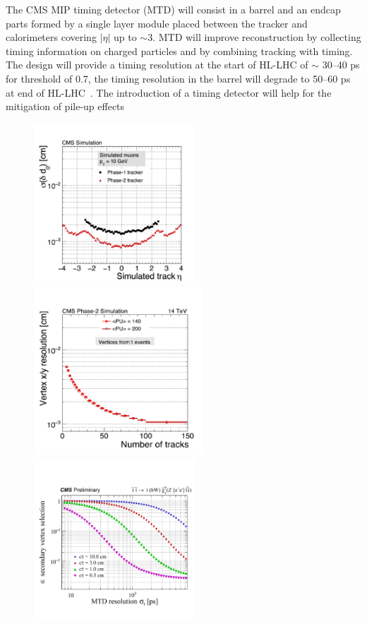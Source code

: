 The CMS MIP timing detector (MTD) will
consist in a barrel and an endcap parts formed by a single layer
module placed between the tracker
and calorimeters covering $|\eta|$ up to $\sim$3.
MTD will improve reconstruction by collecting timing information on
charged particles and by combining tracking with timing. The design will provide a timing resolution
at the start of HL-LHC of $\sim$ 30--40 ps for \pt threshold of
0.7\GeV, the timing resolution in the barrel will degrade to 50--60 ps
at end of HL-LHC~\cite{Marta}. The introduction of a timing detector will help for
the mitigation of pile-up effects
\begin{figure}[h]
\centering
    \includegraphics[clip,trim=0.5cm 0cm 0.cm 1.8cm, height =6cm]{Figures/c7/IPrel.pdf}
    \includegraphics[clip,trim=0.5cm 0cm 0.cm 1.3cm, height = 6.3cm]{Figures/c7/vertexrel.pdf}\\
    \includegraphics[clip,trim=0.5cm 1cm 0.cm 3cm, height = 6cm]{Figures/c7/MDT.pdf}

\end{figure}
